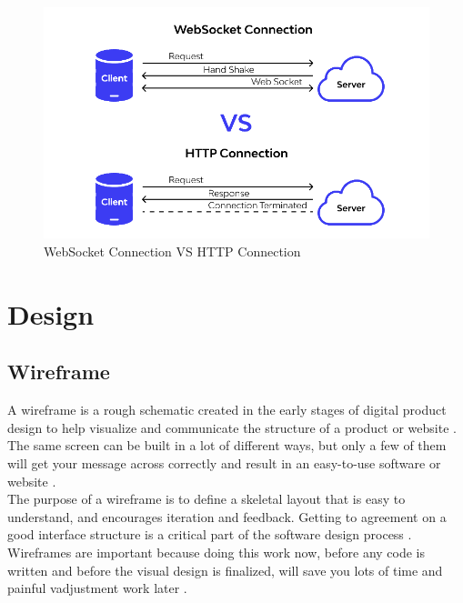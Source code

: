 {\begin{figure}[h!]
    \centering
    \includegraphics[width=0.75\linewidth]{figures/theory/websocket-vs-http.png}
    \caption[WebSocket Connection VS HTTP Connection]{WebSocket Connection VS HTTP Connection \cite{apidog:websocket}}
    \label{fig:websocket-vs-http}
\end{figure}

\section{Design}
\label{sec:design}

\subsection{Wireframe}
\label{subsec:wireframe}

A wireframe is a rough schematic created in the early stages of digital product design to help visualize and communicate the structure of a product or website \cite{balsamiq:wireframe}. \\

The same screen can be built in a lot of different ways, but only a few of them will get your message across correctly and result in an easy-to-use software or website \cite{balsamiq:wireframe}. \\

The purpose of a wireframe is to define a skeletal layout that is easy to understand, and encourages iteration and feedback. Getting to agreement on a good interface structure is a critical part of the software design process \cite{balsamiq:wireframe}. \\

Wireframes are important because doing this work now, before any code is written and before the visual design is finalized, will save you lots of time and painful vadjustment work later \cite{balsamiq:wireframe}.

}

